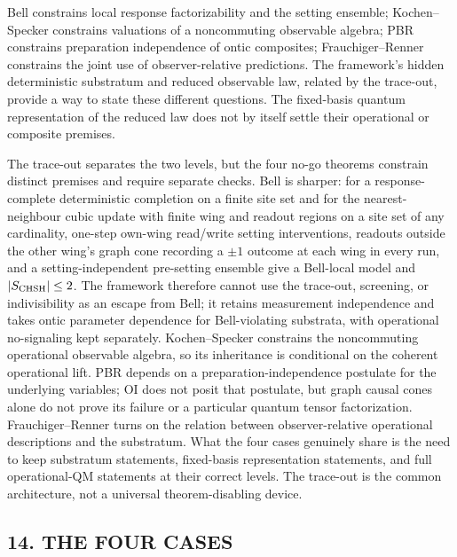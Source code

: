 \documentclass[
]{article}
\begin{document}
Bell constrains local response factorizability and the setting ensemble;
Kochen--Specker constrains valuations of a noncommuting observable
algebra; PBR constrains preparation independence of ontic composites;
Frauchiger--Renner constrains the joint use of observer-relative
predictions. The framework's hidden deterministic substratum and reduced
observable law, related by the trace-out, provide a way to state these
different questions. The fixed-basis quantum representation of the
reduced law does not by itself settle their operational or composite
premises.

The trace-out separates the two levels, but the four no-go theorems
constrain distinct premises and require separate checks. Bell is
sharper: for a response-complete deterministic completion on a finite
site set and for the nearest-neighbour cubic update with finite wing and
readout regions on a site set of any cardinality, one-step own-wing
read/write setting interventions, readouts outside the other wing's
graph cone recording a \(\pm1\) outcome at each wing in every run, and a
setting-independent pre-setting ensemble give a Bell-local model and
\(|S_{\rm CHSH}|\le2\). The framework therefore cannot use the
trace-out, screening, or indivisibility as an escape from Bell; it
retains measurement independence and takes ontic parameter dependence
for Bell-violating substrata, with operational no-signaling kept
separately. Kochen--Specker constrains the noncommuting operational
observable algebra, so its inheritance is conditional on the coherent
operational lift. PBR depends on a preparation-independence postulate
for the underlying variables; OI does not posit that postulate, but
graph causal cones alone do not prove its failure or a particular
quantum tensor factorization. Frauchiger--Renner turns on the relation
between observer-relative operational descriptions and the substratum.
What the four cases genuinely share is the need to keep substratum
statements, fixed-basis representation statements, and full
operational-QM statements at their correct levels. The trace-out is the
common architecture, not a universal theorem-disabling device.

\hypertarget{the-four-cases}{%
\subsection{14. THE FOUR CASES}\label{the-four-cases}}
\end{document}
